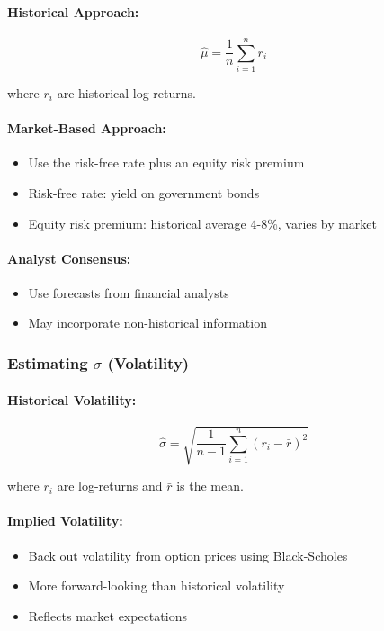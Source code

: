 \documentclass[12pt,a4paper]{article}
\begin{document}
\paragraph{Historical Approach:}
\begin{equation}
\hat{\mu} = \frac{1}{n} \sum_{i=1}^{n} r_i
\end{equation}

where $r_i$ are historical log-returns.

\paragraph{Market-Based Approach:}
\begin{itemize}
    \item Use the risk-free rate plus an equity risk premium
    \item Risk-free rate: yield on government bonds
    \item Equity risk premium: historical average 4-8\%, varies by market
\end{itemize}

\paragraph{Analyst Consensus:}
\begin{itemize}
    \item Use forecasts from financial analysts
    \item May incorporate non-historical information
\end{itemize}

\subsubsection{Estimating $\sigma$ (Volatility)}

\paragraph{Historical Volatility:}
\begin{equation}
\hat{\sigma} = \sqrt{\frac{1}{n-1} \sum_{i=1}^{n} (r_i - \bar{r})^2}
\end{equation}

where $r_i$ are log-returns and $\bar{r}$ is the mean.

\paragraph{Implied Volatility:}
\begin{itemize}
    \item Back out volatility from option prices using Black-Scholes
    \item More forward-looking than historical volatility
    \item Reflects market expectations
\end{itemize}
\end{document}
